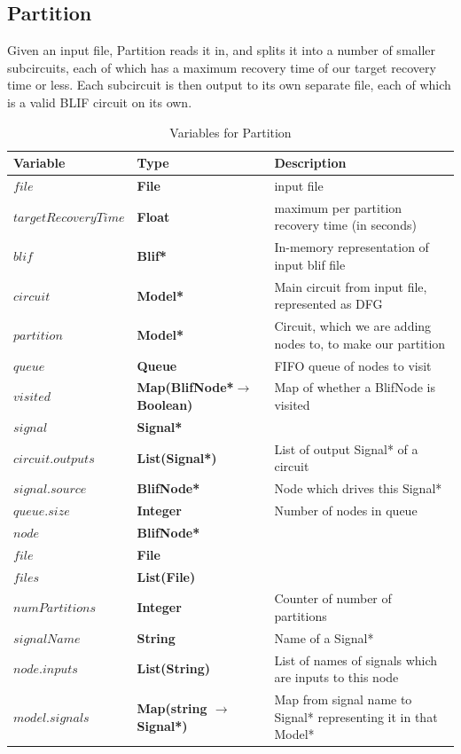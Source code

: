 \documentclass[12pt,final,oneside]{dwThesis} %
\begin{document}
   \newpage
   \subsection{Partition}\label{algPartition}
   Given an input file, Partition reads it in, and splits it into a number of smaller subcircuits, each of which has a maximum recovery time of our target recovery time or less. Each subcircuit is then output to its own separate file, each of which is a valid \gls{BLIF} circuit on its own.
   \begin{table}
      \begin{center}
         \begin{tabularx}{\linewidth}{llX}
            \toprule
            Variable & Type & Description\\
            \midrule
            $file$ &\textbf{ File  } &  input file\\
            $targetRecoveryTime$ &\textbf{ Float } &  maximum per partition recovery time (in seconds)\\
            $blif$ &\textbf{  Blif* } &  In-memory representation of input blif file\\
            $circuit$ &\textbf{   Model* } &  Main circuit from input file, represented as DFG\\
            $partition$ &\textbf{   Model* } &  Circuit, which we are adding nodes to, to make our partition\\
            $queue$ &\textbf{  Queue } &  FIFO queue of nodes to visit\\
            $visited$ &\textbf{   Map(BlifNode*$\to$ Boolean)} &  Map of whether a BlifNode is visited\\
            $signal$ &\textbf{  Signal* } &  \\
            $circuit.outputs$ &\textbf{  List(Signal*) } &  List of output Signal* of a circuit\\
            $signal.source$ &\textbf{  BlifNode* } &  Node which drives this Signal*\\
            $queue.size$ &\textbf{ Integer } &  Number of nodes in queue\\
            $node$ &\textbf{  BlifNode* } &  \\
            $file$ &\textbf{  File } &  \\
            $files$ &\textbf{  List(File) } &  \\
            $numPartitions$ &\textbf{ Integer } &  Counter of number of partitions\\
            $signalName$ &\textbf{ String } &  Name of a Signal*\\
            $node.inputs$ &\textbf{  List(String) } &  List of names of signals which are inputs to this node\\
            $model.signals$ &\textbf{  Map(string $\to$ Signal*) } &  Map from signal name to Signal* representing it in that Model*\\
            \bottomrule
         \end{tabularx}
         \caption{Variables for Partition}
         \label{varPart}
      \end{center}
   \end{table}
\end{document}
